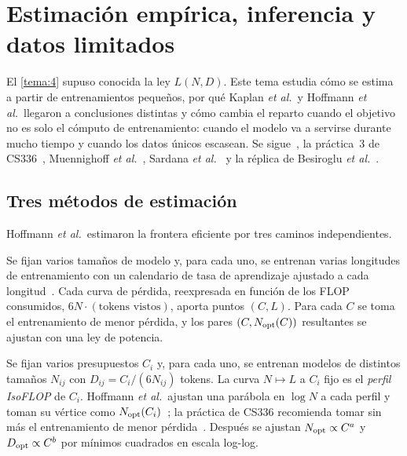 \chapter{Estimación empírica, inferencia y datos limitados}
\label{tema:5}

El \cref{tema:4} supuso conocida la ley $L(N,D)$. Este tema estudia cómo se estima a partir de entrenamientos pequeños, por qué Kaplan \emph{et al.}\ y Hoffmann \emph{et al.}\ llegaron a conclusiones distintas y cómo cambia el reparto cuando el objetivo no es solo el cómputo de entrenamiento: cuando el modelo va a servirse durante mucho tiempo y cuando los datos únicos escasean. Se sigue~\cite[§3.1--3.3 y tabla~2]{hoffmann}, la práctica~3 de CS336~\cite[§2.1]{cs336a3}, Muennighoff \emph{et al.}~\cite[§3.1 y apéndice~A]{muennighoff}, Sardana \emph{et al.}~\cite{sardana} y la réplica de Besiroglu \emph{et al.}~\cite{besiroglu}.

\section{Tres métodos de estimación}

Hoffmann \emph{et al.}\ estimaron la frontera eficiente por tres caminos independientes.

\begin{definicion}
Se fijan varios tamaños de modelo y, para cada uno, se entrenan varias longitudes de entrenamiento con un calendario de tasa de aprendizaje ajustado a cada longitud~\cite[§3.1]{hoffmann}. Cada curva de pérdida, reexpresada en función de los FLOP consumidos, $6N\cdot(\text{tokens vistos})$, aporta puntos $(C,L)$. Para cada $C$ se toma el entrenamiento de menor pérdida, y los pares $(C,N_{\mathrm{opt}}(C))$ resultantes se ajustan con una ley de potencia.
\end{definicion}

\begin{definicion}\label{def:isoflop}
Se fijan varios presupuestos $C_i$ y, para cada uno, se entrenan modelos de distintos tamaños $N_{ij}$ con $D_{ij}=C_i/(6N_{ij})$ tokens. La curva $N\mapsto L$ a $C_i$ fijo es el \emph{perfil IsoFLOP} de $C_i$. Hoffmann \emph{et al.}\ ajustan una parábola en $\log N$ a cada perfil y toman su vértice como $N_{\mathrm{opt}}(C_i)$~\cite[§3.2]{hoffmann}; la práctica de CS336 recomienda tomar sin más el entrenamiento de menor pérdida~\cite[§2.1]{cs336a3}. Después se ajustan $N_{\mathrm{opt}}\propto C^{a}$ y $D_{\mathrm{opt}}\propto C^{b}$ por mínimos cuadrados en escala log-log.
\end{definicion}

